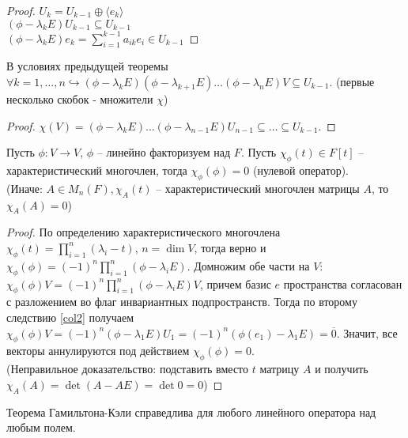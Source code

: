 \begin{proof}
    $U_k = U_{k - 1} \oplus \langle e_k \rangle$ \\
    $(\phi - \lambda_k E) U_{k - 1} \subseteq U_{k - 1}$ \\
    $(\phi - \lambda_k E) e_k = \sum_{i=1}^{k - 1} a_{ik}e_i \in U_{k - 1}$
\end{proof}

\begin{corollary}
    \label{col2}
    В условиях предыдущей теоремы $\forall k = 1, \dots, n \hookrightarrow (\phi - \lambda_k E)(\phi - \lambda_{k + 1} E) \dots (\phi - \lambda_n E) V \subseteq U_{k - 1}$. (первые несколько скобок - множители $\chi$)
\end{corollary}

\begin{proof}
    $\chi(V) = (\phi - \lambda_k E) \dots (\phi - \lambda_{n - 1} E) U_{n - 1} \subseteq \dots \subseteq U_{k - 1}$.
\end{proof}

\begin{theorem}
    \label{th4.4}
    Пусть $\phi: V \to V$, $\phi$ -- линейно факторизуем над $F$. Пусть $\chi_{\phi}(t) \in F[t]$ -- характеристический многочлен, тогда $\chi_{\phi}(\phi) = 0$ (нулевой оператор).\\
    (Иначе: $A \in M_n(F), \chi_A(t)$ -- характеристический многочлен матрицы $A$, то $\chi_A(A) = 0$)
\end{theorem}

\begin{proof}
    По определению характеристического многочлена $\chi_{\phi}(t) =  \prod_{i=1}^n (\lambda_i - t)$, $n = \dim V$, тогда верно и $\chi_{\phi}(\phi) = (-1)^n \prod_{i=1}^n (\phi - \lambda_i E)$. Домножим обе части на $V$: $\chi_{\phi}(\phi) V = (-1)^n \prod_{i=1}^n (\phi - \lambda_i E) V$, причем базис $e$ пространства согласован с разложением во флаг инвариантных подпространств. Тогда по второму следствию \ref{col2} получаем $\chi_{\phi}(\phi) V = (-1)^n (\phi - \lambda_1 E) U_1 = (-1)^n (\phi(e_1) - \lambda_1 E) = \overline{0}$. Значит, все векторы аннулируются под действием $\chi_{\phi}(\phi) = 0$. \\
    (Неправильное доказательство: подставить вместо $t$ матрицу $A$ и получить $\chi_{A}(A) = \det (A - AE) = \det 0 = 0$)
\end{proof}

\begin{note}
    Теорема Гамильтона-Кэли справедлива для любого линейного оператора над любым полем.
\end{note}

